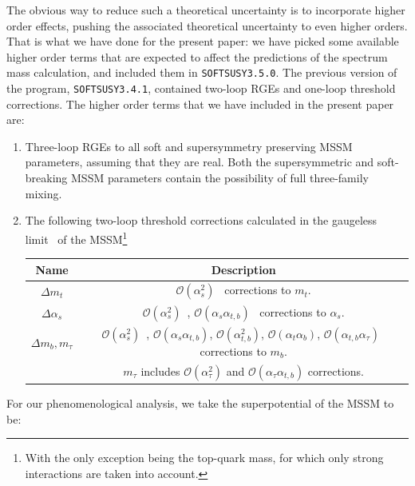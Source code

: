 \documentclass[final,3p,times,pdflatex]{elsarticle}
\begin{document}
The obvious way to reduce such a theoretical uncertainty is to incorporate
higher order effects, pushing the associated theoretical uncertainty to even
higher orders.
That is what we have done for the present paper: we have
picked some available higher order terms that are expected to affect the
predictions of the spectrum mass calculation, and included them in
{\tt SOFTSUSY3.5.0}. The previous version of the program, {\tt SOFTSUSY3.4.1}, 
contained two-loop RGEs and one-loop threshold corrections. 
The higher order terms that we have included in the present paper are: 
\begin{enumerate}
\item
	Three-loop RGEs \cite{Jack:2004ch} to all soft and supersymmetry preserving MSSM parameters, 
assuming that they are real. Both the supersymmetric and soft-breaking MSSM parameters 
contain the possibility of full three-family mixing. 
\item
The following two-loop threshold
corrections calculated in the gaugeless limit~\cite{Haestier:2005ja} of the MSSM\footnote{With the only exception being the top-quark mass, for which only strong interactions are taken into account.}
\begin{center}
\begin{tabular}{|c|c|}\hline
Name & Description \\ \hline
$\Delta m_t$ & $\mathcal O(\alpha_s^2)$~\cite{Bednyakov:2002sf,Bednyakov:2005kt} corrections to $m_t$.  \\
$\Delta \alpha_s$ & $\mathcal O(\alpha_s^2)$~\cite{Harlander:2005wm,Bauer:2008bj}, $\mathcal O(\alpha_s \alpha_{t,b})$~\cite{Bednyakov:2010ni} corrections to $\alpha_s$. \\
$\Delta m_b, m_\tau$ & $\mathcal O(\alpha_s^2)$~\cite{Bauer:2008bj,Bednyakov:2007vm}, $\mathcal O(\alpha_s \alpha_{t,b})$, $\mathcal O(\alpha_{t,b}^2)$, $\mathcal O(\alpha_t \alpha_b)$, 
$\mathcal O(\alpha_{t,b} \alpha_\tau)$~\cite{Bednyakov:2009wt} corrections to $m_b$. \\ &
$m_\tau$ includes $\mathcal O(\alpha_\tau^2)$  and $\mathcal O(\alpha_\tau \alpha_{t,b})$ \cite{Bednyakov:2009wt} corrections. 
 \\
\hline \end{tabular}
\end{center}
\end{enumerate}
For our phenomenological analysis, we take the superpotential of the MSSM to be:
\end{document}
